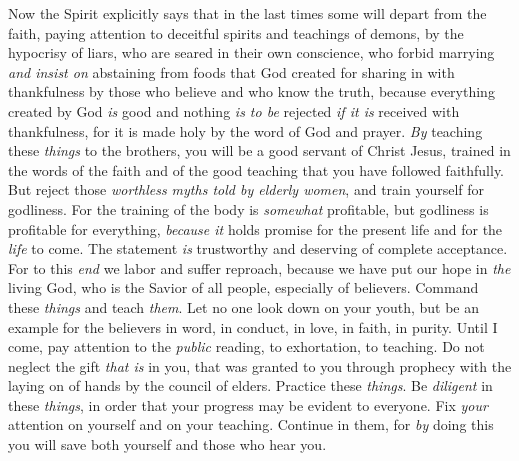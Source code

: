 \begin{biblechapter} %
 Now the Spirit explicitly says that in the last times some will depart from the faith, paying attention to deceitful spirits and teachings of demons,
\verse by the hypocrisy of liars, who are seared in their own conscience,
\verse who forbid marrying \textit{and insist on} abstaining from foods that God created for sharing in with thankfulness by those who believe and who know the truth,
\verse because everything created by God \textit{is} good and nothing \textit{is to be} rejected \textit{if it is} received with thankfulness,
\verse for it is made holy by the word of God and prayer.
 \textit{By} teaching these \textit{things} to the brothers, you will be a good servant of Christ Jesus, trained in the words of the faith and of the good teaching that you have followed faithfully.
\verse But reject those \textit{worthless myths told by elderly women}, and train yourself for godliness.
\verse For the training of the body is \textit{somewhat} profitable, but godliness is profitable for everything, \textit{because it} holds promise for the present life and for the \textit{life} to come.
\verse The statement \textit{is} trustworthy and deserving of complete acceptance.
\verse For to this \textit{end} we labor and suffer reproach, because we have put our hope in \textit{the} living God, who is the Savior of all people, especially of believers.
\verse Command these \textit{things} and teach \textit{them}.
\verse Let no one look down on your youth, but be an example for the believers in word, in conduct, in love, in faith, in purity.
\verse Until I come, pay attention to the \textit{public} reading, to exhortation, to teaching.
\verse Do not neglect the gift \textit{that is} in you, that was granted to you through prophecy with the laying on of hands by the council of elders.
\verse Practice these \textit{things}. Be \textit{diligent} in these \textit{things}, in order that your progress may be evident to everyone.
\verse Fix \textit{your} attention on yourself and on your teaching. Continue in them, for \textit{by} doing this you will save both yourself and those who hear you.
\end{biblechapter}

